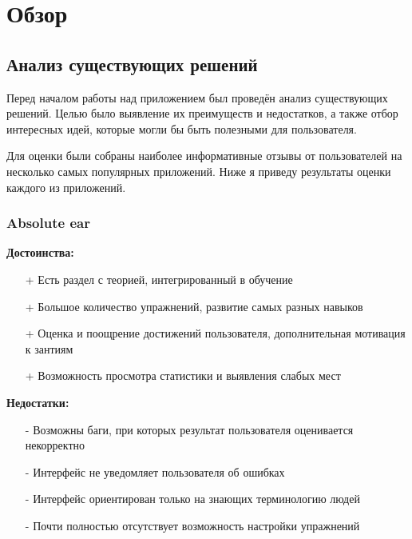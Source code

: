 \titleformat{\chapter}[display]
  {\normalfont\bfseries}{}{0pt}{\Huge}
\chapter{Обзор}
\section{Анализ существующих решений}
Перед началом работы над приложением был проведён анализ существующих решений. Целью было выявление их преимуществ и недостатков, а также отбор интересных идей, которые могли бы быть полезными для пользователя. \par
Для оценки были собраны наиболее информативные отзывы от пользователей на несколько самых популярных приложений. Ниже я приведу результаты оценки каждого из приложений.
\subsection*{Absolute ear\cite{Apps1}}
\begin{minipage}[t]{0.45\textwidth}
\textbf{Достоинства:}
\begin{itemize}
  \item[+] Есть раздел с теорией, интегрированный в обучение
  \item[+] Большое количество упражнений, развитие самых разных навыков
  \item[+] Оценка и поощрение достижений пользователя, дополнительная мотивация к зантиям
  \item[+] Возможность просмотра статистики и выявления слабых мест
\end{itemize}
\end{minipage}
\hfill
\begin{minipage}[t]{0.45\textwidth}
\textbf{Недостатки:}
\begin{itemize}
  \item[-] Возможны баги, при которых результат пользователя оценивается некорректно
  \item[-] Интерфейс не уведомляет пользователя об ошибках
  \item[-] Интерфейс ориентирован только на знающих терминологию людей
  \item[-] Почти полностью отсутствует возможность настройки упражнений
\end{itemize}
\end{minipage}
